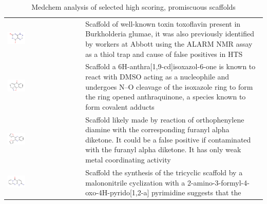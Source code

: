 \begin{table}
\caption{Medchem analysis of selected high scoring, promiscuous scaffolds}
\begin{tabular}{p{0.3\linewidth}p{0.7\linewidth}}
\hline
\includegraphics[align=t,width=0.25\textwidth]{data/badapple/medchem_01.png} & Scaffold of well-known toxin toxoflavin present in Burkholderia glumae, it was also previously identified by workers at Abbott using the ALARM NMR assay as a thiol trap and cause of false positives in HTS\cite{Huth2007-kc}\\
\includegraphics[align=t,width=0.25\textwidth]{data/badapple/medchem_02.png} & Scaffold a 6H-anthra[1,9-cd]isoxazol-6-one is known to react with DMSO acting as a nucleophile and undergoes N–O cleavage of the isoxazole ring to form the ring opened anthraquinone, a species known to form covalent adducts\cite{Sutter1982-qu}\\
\includegraphics[align=t,width=0.25\textwidth]{data/badapple/medchem_03.png} & Scaffold likely made by reaction of orthophenylene diamine with the corresponding furanyl alpha diketone. It could be a false positive if contaminated with the furanyl alpha diketone. It has only weak metal coordinating activity\\
\includegraphics[align=t,width=0.25\textwidth]{data/badapple/medchem_04.png} & Scaffold the synthesis of the tricyclic scaffold by a malononitrile cyclization with a 2-amino-3-formyl-4-oxo-4H-pyrido[1,2-a] pyrimidine suggests that the

\end{tabular}
\end{table}
